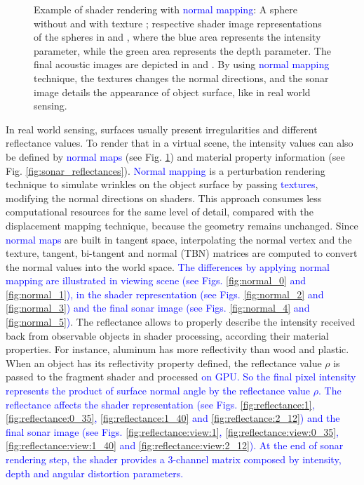 \documentclass[final,5p,times]{elsarticle}
\begin{document}
\begin{figure}[!ht]
{        \label{fig:normal_5}
    }
    \captionsetup{justification=justified}
    \caption{Example of shader rendering with \textcolor{blue}{normal mapping}:
    A sphere without  and with texture
    ; respective shader image representations of the spheres
    in  and , where the blue area represents the
    intensity parameter, while the green area represents the depth parameter. The final acoustic
    images are depicted in  and . By using
    \textcolor{blue}{normal mapping} technique, the textures changes the normal directions,
    and the sonar image details the appearance of object surface, like
    in real world sensing.}
    \label{fig:sonar_normal_mapping}
\end{figure}

In real world sensing, surfaces usually present irregularities
and different reflectance values. To render that in a virtual scene, the
intensity values can also be defined by \textcolor{blue}{normal maps} (see Fig. \ref{fig:sonar_normal_mapping}) and material property information (see Fig. \ref{fig:sonar_reflectances}). \textcolor{blue}{Normal mapping} is a perturbation rendering technique to simulate wrinkles on the object surface by passing \textcolor{blue}{textures}, modifying
the normal directions on shaders. This approach consumes less computational
resources for the same level of detail, compared with the displacement mapping
technique, because the geometry remains unchanged. Since \textcolor{blue}{normal maps} are built in tangent space, interpolating the normal vertex and the texture, tangent, bi-tangent and normal (TBN) matrices are computed to convert the normal values into the world space. \textcolor{blue}{The differences by applying normal mapping are illustrated in viewing scene (see Figs. \ref{fig:normal_0} and \ref{fig:normal_1}), in the shader representation (see Figs. \ref{fig:normal_2} and \ref{fig:normal_3}) and the final sonar image (see Figs. \ref{fig:normal_4} and \ref{fig:normal_5})}. The reflectance allows to properly describe the intensity received back
from observable objects in shader processing, according their material
properties. For instance, aluminum has more reflectivity than wood and plastic.
When an object has its reflectivity property defined, the reflectance value
$\rho$ is passed to the fragment shader and processed \textcolor{blue}{on GPU. So the final
pixel intensity represents the product of surface normal angle by the reflectance
value $\rho$. The reflectance affects the shader representation (see Figs. \ref{fig:reflectance:1}, \ref{fig:reflectance:0_35}, \ref{fig:reflectance:1_40} and \ref{fig:reflectance:2_12}) and the final sonar image (see Figs. \ref{fig:reflectance:view:1}, \ref{fig:reflectance:view:0_35}, \ref{fig:reflectance:view:1_40} and \ref{fig:reflectance:view:2_12}).
At the end of sonar rendering step, the shader provides a 3-channel matrix composed by intensity, depth and angular
distortion parameters.}
\end{document}
